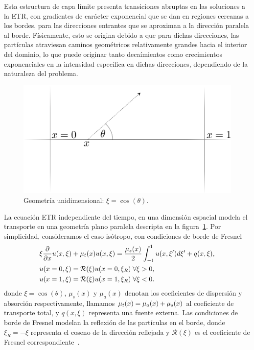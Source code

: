 Esta estructura de capa límite presenta transiciones abruptas 
en las soluciones a la ETR, con gradientes de carácter exponencial 
que se dan en regiones cercanas a los bordes, para las direcciones 
entrantes que se aproximan a la dirección paralela al borde. 
Físicamente, esto se origina debido a que para dichas direcciones, 
las partículas atraviesan caminos geométricos relativamente grandes 
hacia el interior del dominio, lo que puede originar tanto decaímientos 
como crecimientos exponenciales en la intensidad específica en dichas direcciones, 
dependiendo de la naturaleza del problema.
\begin{figure}[h!]
\centering
  \includegraphics[width=0.5\linewidth]{figuras/geom.pdf}
  \caption{Geometría unidimensional: $\xi = \cos(\theta)$.}
 \label{fig:parallelgeom}
\end{figure}
La ecuación ETR independiente del tiempo, en una dimensión espacial 
modela el transporte en una geometría plano paralela descripta en la 
figura~\ref{fig:parallelgeom}. Por simplicidad, consideramos 
el caso isótropo, con condiciones de borde de Fresnel
\begin{equation}
\begin{split}
  &\xi \frac{\partial}{\partial x}u(x,\xi)+\mu_t(x)u(x,\xi)=   \frac{\mu_s(x)}{2} \int_{-1}^{1}u(x,\xi') d\xi' +q(x,\xi),\\
  &u(x=0,\xi)=\mathcal{R}(\xi)u(x=0,\xi_R) \; \forall \xi>0,\\
  &u(x=1,\xi)=\mathcal{R}(\xi)u(x=1,\xi_R) \; \forall \xi<0.
\end{split}
\label{eq:transp1d}
\end{equation}
donde $\xi=\cos(\theta)$,  $\mu_s(x)$ y $\mu_a(x)$ denotan 
los coeficientes de dispersión y absorción respectivamente, 
llamamos $\mu_t(x)=\mu_a(x)+\mu_s(x)$ al coeficiente de transporte 
total, y $q(x,\xi)$ representa una fuente externa. Las condiciones de 
borde de Fresnel modelan la reflexión de las partículas en el borde, 
donde $\xi_R=-\xi$ representa el coseno de la dirección reflejada 
y $\mathcal{R}(\xi)$ es el coeficiente de Fresnel correspondiente~\cite{Born1999}.

